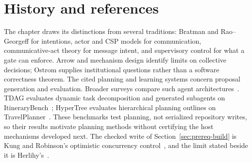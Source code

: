 \section{History and references}
The chapter draws its distinctions from several traditions: Bratman and
Rao--Georgeff for intentions, actor and CSP models for communication,
communicative-act theory for message intent, and supervisory control for
what a gate can enforce. Arrow and mechanism design identify limits on
collective decisions; Ostrom supplies institutional questions rather than a
software correctness theorem. The cited planning and learning systems concern proposal generation and
evaluation. Broader surveys compare such agent architectures~.
TDAG evaluates dynamic task decomposition and generated subagents on
ItineraryBench~; HyperTree evaluates hierarchical planning
outlines on TravelPlanner~. These benchmarks test
planning, not serialized repository writes, so their results motivate planning
methods without certifying the host mechanisms developed next.
The checked write of Section~\ref{sec:prereq-build} is Kung and Robinson's
optimistic concurrency control~, and the limit
stated beside it is Herlihy's~.


\providecommand{\pdchapterhandoffprereq}{%
}
\pdchapterhandoffprereq

\clearpage

